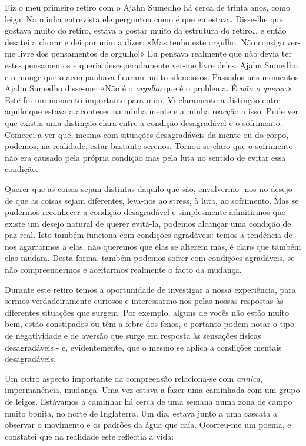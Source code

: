 Fiz o meu primeiro retiro com o Ajahn Sumedho há cerca de trinta anos,
como leiga. Na minha entrevista ele perguntou como é que eu estava.
Disse-lhe que gostava muito do retiro, estava a gostar muito da
estrutura do retiro\ldots{} e então desatei a chorar e dei por mim a
dizer: «Mas tenho este orgulho. Não consigo \mbox{ver-me} livre dos pensamentos
de orgulho!» Eu pensava realmente que não devia ter estes pensamentos e
queria desesperadamente ver-me livre deles. Ajahn Sumedho e o monge que
o acompanhava ficaram muito silenciosos. Passados uns momentos Ajahn
Sumedho disse-me: «Não é o \emph{orgulho} que é o problema. É \emph{não
o querer}.» Este foi um momento importante para mim. Vi claramente a
distinção entre aquilo que estava a acontecer na minha mente e a minha
reacção a isso. Pude ver que existia uma distinção clara entre a
condição desagradável e o sofrimento. Comecei a ver que, mesmo com
situações desagradáveis da mente ou do corpo, podemos, na realidade,
estar bastante serenos. Tornou-se claro que o sofrimento não era causado
pela própria condição mas pela luta no sentido de evitar essa condição.

Querer que as coisas sejam distintas daquilo que são, envolvermo-\linebreak -nos no
desejo de que as coisas sejam diferentes, leva-nos ao stress, à luta, ao
sofrimento. Mas se pudermos reconhecer a condição desagradável e
simplesmente admitirmos que existe um desejo natural de querer evitá-la,
podemos alcançar uma condição de paz real. Isto também funciona com
condições agradáveis: temos a tendência de nos agarrarmos a elas, não
queremos que elas se alterem mas, é claro que também elas mudam. Desta
forma, também podemos sofrer com condições agradáveis, se não
compreendermos e aceitarmos realmente o facto da mudança.

Durante este retiro temos a oportunidade de investigar a nossa
experiência, para sermos verdadeiramente curiosos e interessarmo-nos
pelas nossas respostas às diferentes situações que surgem. Por exemplo,
alguns de vocês não estão muito bem, estão constipados ou têm a febre
dos fenos, e portanto podem notar o tipo de negatividade e de aversão
que surge em resposta às sensações físicas desagradáveis - e,
evidentemente, que o mesmo se aplica a condições mentais desagradáveis.

Um outro aspecto importante da compreensão relaciona-se com
\emph{annica}, impermanência, mudança. Uma vez estava a fazer uma
caminhada com um grupo de leigos. Estávamos a caminhar há cerca de uma
semana numa zona de campo muito bonita, no norte de Inglaterra. Um dia,
estava junto a uma cascata a observar o movimento e os padrões da água
que caía. Ocorreu-me um poema, e constatei que na realidade este
reflectia a vida:

